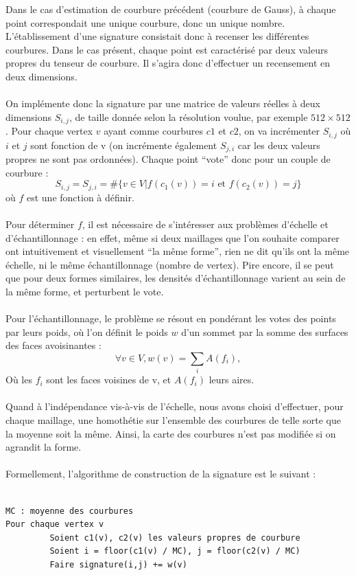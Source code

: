 \documentclass{llncs}
\begin{document}
Dans le cas d’estimation de courbure précédent (courbure de Gauss), à chaque point correspondait une unique courbure, donc un unique nombre. L’établissement d’une signature consistait donc à recenser les différentes courbures. Dans le cas présent, chaque point est caractérisé par deux valeurs propres du tenseur de courbure. Il s’agira donc d’effectuer un recensement en deux dimensions.
\\\\
On implémente donc la signature par une matrice de valeurs réelles à deux dimensions $S_{i,j}$, de taille donnée selon la résolution voulue, par exemple $ 512 \times 512 $. Pour chaque vertex $ v $ ayant comme courbures $ c1$ et $c2 $, on va incrémenter $ S_{i,j} $ où $i$ et $j$ sont fonction de v (on incrémente également $ S_{j,i} $ car les deux valeurs propres ne sont pas ordonnées). Chaque point ``vote'' donc pour un couple de courbure :
$$
S_{i,j} = S_{j,i} = \# \{v\in V|f(c_1(v))=i \mbox{ et } f(c_2(v))=j \}
$$
où $f$ est une fonction à définir.
\\\\
Pour déterminer $f$, il est nécessaire de s’intéresser aux problèmes d’échelle et d’échantillonnage : en effet, même si deux maillages que l’on souhaite comparer ont intuitivement et visuellement ``la même forme'', rien ne dit qu’ils ont la même échelle, ni le même échantillonnage (nombre de vertex). Pire encore, il se peut que pour deux formes similaires, les densités d’échantillonnage varient au sein de la même forme, et perturbent le vote.
\\\\
Pour l’échantillonnage, le problème se résout en pondérant les votes des points par leurs poids, où l’on définit le poids $w$ d’un sommet par la somme des surfaces des faces avoisinantes :
$$
\forall v\in V, w(v) = \sum_{i}{A(f_i)},
$$
Où les $f_i$ sont les faces voisines de v, et $A(f_i)$ leurs aires.
\\\\
Quand à l'indépendance vis-à-vis de l'échelle, nous avons choisi d’effectuer, pour chaque maillage, une homothétie sur l’ensemble des courbures de telle sorte que la moyenne soit la même. Ainsi, la carte des courbures n’est pas modifiée si on agrandit la forme.
\\\\
Formellement, l’algorithme de construction de la signature est le suivant :
\\\\
\begin{verbatim}
MC : moyenne des courbures
Pour chaque vertex v
         Soient c1(v), c2(v) les valeurs propres de courbure
         Soient i = floor(c1(v) / MC), j = floor(c2(v) / MC)
         Faire signature(i,j) += w(v)
\end{verbatim}
\end{document}

